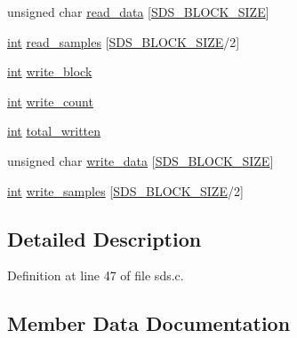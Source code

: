 \begin{DoxyCompactItemize}
\item 
unsigned char \hyperlink{structtag___s_d_s___p_r_i_v_a_t_e_a2a0fdc8dca595c05cc45ca8dd79b6fe6}{read\+\_\+data} \mbox{[}\hyperlink{sds_8c_ac3b89edd34b1cf3ba136e457d08455e1}{S\+D\+S\+\_\+\+B\+L\+O\+C\+K\+\_\+\+S\+I\+ZE}\mbox{]}
\item 
\hyperlink{xmltok_8h_a5a0d4a5641ce434f1d23533f2b2e6653}{int} \hyperlink{structtag___s_d_s___p_r_i_v_a_t_e_ae7cdb27a7b8c1ed4789c5d50705fd6e0}{read\+\_\+samples} \mbox{[}\hyperlink{sds_8c_ac3b89edd34b1cf3ba136e457d08455e1}{S\+D\+S\+\_\+\+B\+L\+O\+C\+K\+\_\+\+S\+I\+ZE}/2\mbox{]}
\item 
\hyperlink{xmltok_8h_a5a0d4a5641ce434f1d23533f2b2e6653}{int} \hyperlink{structtag___s_d_s___p_r_i_v_a_t_e_abf8cb53c64849f7045fdbb2c4db77b01}{write\+\_\+block}
\item 
\hyperlink{xmltok_8h_a5a0d4a5641ce434f1d23533f2b2e6653}{int} \hyperlink{structtag___s_d_s___p_r_i_v_a_t_e_a2307c65ee697648e89cd92ce64f3448f}{write\+\_\+count}
\item 
\hyperlink{xmltok_8h_a5a0d4a5641ce434f1d23533f2b2e6653}{int} \hyperlink{structtag___s_d_s___p_r_i_v_a_t_e_a61d18a97ff31bb15a9fdee11e4726132}{total\+\_\+written}
\item 
unsigned char \hyperlink{structtag___s_d_s___p_r_i_v_a_t_e_a399f9603046c205232d55a93c63101d5}{write\+\_\+data} \mbox{[}\hyperlink{sds_8c_ac3b89edd34b1cf3ba136e457d08455e1}{S\+D\+S\+\_\+\+B\+L\+O\+C\+K\+\_\+\+S\+I\+ZE}\mbox{]}
\item 
\hyperlink{xmltok_8h_a5a0d4a5641ce434f1d23533f2b2e6653}{int} \hyperlink{structtag___s_d_s___p_r_i_v_a_t_e_ad2a58fad6ba62b7999eee100657ea06d}{write\+\_\+samples} \mbox{[}\hyperlink{sds_8c_ac3b89edd34b1cf3ba136e457d08455e1}{S\+D\+S\+\_\+\+B\+L\+O\+C\+K\+\_\+\+S\+I\+ZE}/2\mbox{]}
\end{DoxyCompactItemize}


\subsection{Detailed Description}


Definition at line 47 of file sds.\+c.



\subsection{Member Data Documentation}
